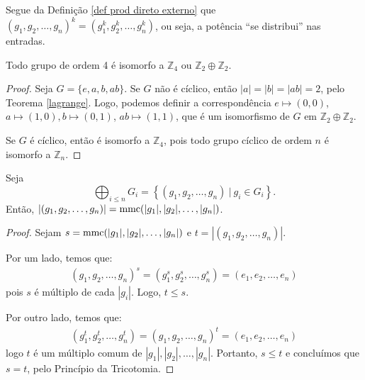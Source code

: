 	\begin{remark}
		Segue da Definição \ref{def prod direto externo} que 
		$(g_1, g_2, \dots, g_n)^k = (g_1^k, g_2^k, \dots, g_n^k)$, ou seja, 
		a potência ``se distribui'' nas entradas.
	\end{remark}
	\begin{theorem}
	\label{teo-class-grupos-ord-4}
		Todo grupo de ordem 4 é isomorfo a $\mathbb{Z}_4$ 
		ou $\mathbb{Z}_2\oplus\mathbb{Z}_2$.
	\end{theorem}
	\begin{proof}
		Seja $G = \{e, a, b, ab\}$. Se $G$ não é cíclico, então 
		$|a| = |b| = |ab| = 2$, pelo Teorema \ref{lagrange}. 
		Logo, podemos definir a correspondência 
		$e\mapsto (0,0)$, $a\mapsto (1,0), b\mapsto (0,1)$, $ab\mapsto (1,1)$, que é um
		isomorfismo de $G$ em $\mathbb{Z}_2\oplus\mathbb{Z}_2$.
		\par\vspace{0.3cm} Se $G$ é cíclico, então é isomorfo a
		$\mathbb{Z}_4$, pois todo grupo cíclico de ordem $n$ é isomorfo 
		a $\mathbb{Z}_n$. 
	\end{proof}
	\begin{theorem}
	\label{ordem}
		Seja 
		\begin{equation*}
		\bigoplus_{i \leq n} G_i = \left\{(g_1, g_2, \dots , g_n) \ | \ g_i\in G_i \right\}. 
		\end{equation*}
		Então,
		$|(g_1, g_2, \dots , g_n)| = \operatorname{mmc}(|g_1|, |g_2|, \dots , |g_n|)$.
	\end{theorem}
	\begin{proof}
		Sejam $s = \operatorname{mmc}(|g_1|, |g_2|, \dots, |g_n|)$ e 
		$t = |(g_1, g_2, \dots , g_n)|$.
		\par\vspace{0.3cm} Por um lado, temos que:
		\begin{align*}
		    (g_1, g_2, \dots , g_n)^s 
		    = (g_1^s, g_2^s, \dots , g_n^s) 
		    = (e_1, e_2, \dots , e_n)
		\end{align*}
		pois $s$ é múltiplo de cada $|g_i|$. Logo, $t\leq s$.
		\par\vspace{0.3cm} Por outro lado, temos que:
		\begin{align*}
		    (g_1^t, g_2^t, \dots , g_n^t) 
		    = (g_1, g_2, \dots , g_n)^t 
		    = (e_1, e_2, \dots , e_n)
		\end{align*}
		logo $t$ é um múltiplo comum de $|g_1|, |g_2|, \dots , |g_n|$.
		Portanto, $s\leq t$ e concluímos que $s = t$, pelo 
		Princípio da Tricotomia. 
	\end{proof}
